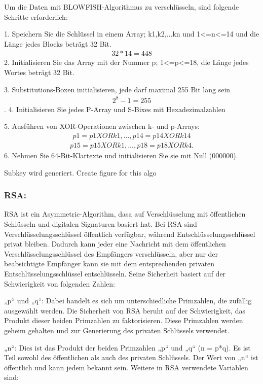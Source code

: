 Um die Daten mit BLOWFISH-Algorithmus zu verschlüsseln, sind folgende Schritte erforderlich:

1. Speichern Sie die Schlüssel in einem Array; k1,k2,...kn und 1<=n<=14
und die Länge jedes Blocks beträgt 32 Bit.\begin{align*}
32*14=448 \end{align*}
2. Initialisieren Sie das Array mit der Nummer p; 1<=p<=18, die Länge jedes Wortes beträgt 32 Bit.

3. Substitutions-Boxen initialisieren, jede darf maximal 255 Bit lang sein\begin{align*}
    2^8 -1 = 255 \end{align*}.
4. Initialisieren Sie jedes P-Array und S-Bixes mit Hexadezimalzahlen

5. Ausführen von XOR-Operationen zwischen k- und p-Arrays:\begin{align*} p1 = p1 XOR k1, ..., p14 = p14 XOR k14 \end{align*} \begin{align*} p15 = p15 XOR k1 , ... , p18 = p18 XOR k4.\end{align*}
6. Nehmen Sie 64-Bit-Klartexte und initialisieren Sie sie mit Null (000000).

Subkey wird generiert.
Create figure for this algo

\subsubsection{RSA:}

RSA ist ein Asymmetric-Algorithm, dasa auf Verschlüsselung mit öffentlichen Schlüsseln und digitalen Signaturen basiert hat. Bei RSA sind Verschlüsselungsschlüssel öffentlich verfügbar, während Entschlüsselungsschlüssel privat bleiben. Dadurch kann jeder eine Nachricht mit dem öffentlichen Verschlüsselungsschlüssel des Empfängers verschlüsseln, aber nur der beabsichtigte Empfänger kann sie mit dem entsprechenden privaten Entschlüsselungsschlüssel entschlüsseln. Seine Sicherheit basiert auf der Schwierigkeit von folgenden Zahlen:

„p“ und „q“: Dabei handelt es sich um unterschiedliche Primzahlen, die zufällig ausgewählt werden. Die Sicherheit von RSA beruht auf der Schwierigkeit, das Produkt dieser beiden Primzahlen zu faktorisieren. Diese Primzahlen werden geheim gehalten und zur Generierung des privaten Schlüssels verwendet.

„n“: Dies ist das Produkt der beiden Primzahlen „p“ und „q“ (n = p*q). Es ist Teil sowohl des öffentlichen als auch des privaten Schlüssels. Der Wert von „n“ ist öffentlich und kann jedem bekannt sein.
Weitere in RSA verwendete Variablen sind:

